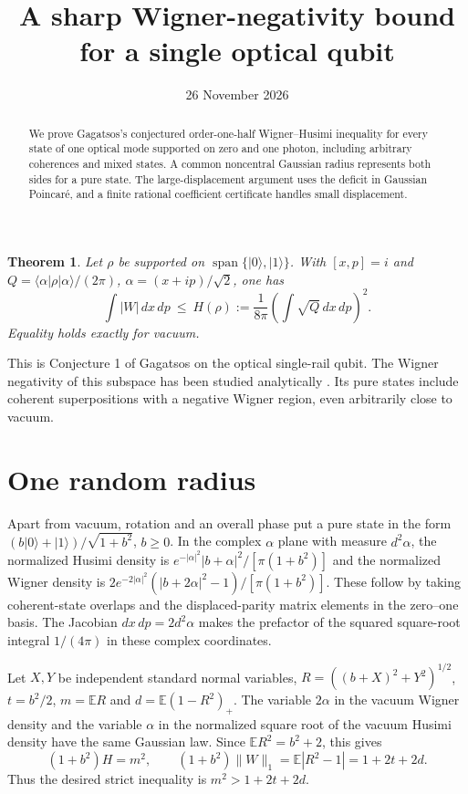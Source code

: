 \documentclass[10pt]{article}
\title{A sharp Wigner-negativity bound for a single optical qubit}
\date{26 November 2026}
\newtheorem{theorem}{Theorem}
\newcommand{\E}{\mathbb E}
\begin{document}
\maketitle
\begin{abstract}
We prove Gagatsos's conjectured order-one-half Wigner--Husimi inequality for every state of one optical mode supported on zero and one photon, including arbitrary coherences and mixed states. A common noncentral Gaussian radius represents both sides for a pure state. The large-displacement argument uses the deficit in Gaussian Poincar\'e, and a finite rational coefficient certificate handles small displacement.
\end{abstract}
\begin{theorem}
Let $\rho$ be supported on $\operatorname{span}\{|0\rangle,|1\rangle\}$. With $[x,p]=i$ and $Q=\langle\alpha|\rho|\alpha\rangle/(2\pi)$, $\alpha=(x+ip)/\sqrt2$, one has
\[
 \int |W|\,dx\,dp\ \le\ H(\rho):=\frac{1}{8\pi}\left(\int\sqrt Q\,dx\,dp\right)^2 .
\]
Equality holds exactly for vacuum.
\end{theorem}
This is Conjecture 1 of Gagatsos \cite{gag} on the optical single-rail qubit. The Wigner negativity of this subspace has been studied analytically \cite{romero}. Its pure states include coherent superpositions with a negative Wigner region, even arbitrarily close to vacuum.

\section{One random radius}
Apart from vacuum, rotation and an overall phase put a pure state in the form $(b|0\rangle+|1\rangle)/\sqrt{1+b^2}$, $b\ge0$. In the complex $\alpha$ plane with measure $d^2\alpha$, the normalized Husimi density is $e^{-|\alpha|^2}|b+\alpha|^2/[\pi(1+b^2)]$ and the normalized Wigner density is $2e^{-2|\alpha|^2}(|b+2\alpha|^2-1)/[\pi(1+b^2)]$. These follow by taking coherent-state overlaps and the displaced-parity matrix elements in the zero--one basis. The Jacobian $dx\,dp=2d^2\alpha$ makes the prefactor of the squared square-root integral $1/(4\pi)$ in these complex coordinates.

Let $X,Y$ be independent standard normal variables, $R=((b+X)^2+Y^2)^{1/2}$, $t=b^2/2$, $m=\E R$ and $d=\E(1-R^2)_+$. The variable $2\alpha$ in the vacuum Wigner density and the variable $\alpha$ in the normalized square root of the vacuum Husimi density have the same Gaussian law. Since $\E R^2=b^2+2$, this gives
\[
 (1+b^2)H=m^2,\qquad (1+b^2)\|W\|_1=\E|R^2-1|=1+2t+2d .
\]
Thus the desired strict inequality is $m^2>1+2t+2d$.
\end{document}
